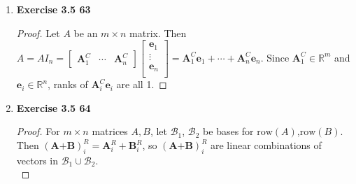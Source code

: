 \begin{enumerate}
\begin{proof}
		\noindent ($\Leftarrow$)
		Suppose that for $ \textbf{u}=\begin{bmatrix}
		u_1 \\
		\vdots \\
		u_m \\
		\end{bmatrix} \in \mathbb{R}^m $ and 
		$ \textbf{v}=\begin{bmatrix}
		v_1 \\
		\vdots \\
		v_m \\
		\end{bmatrix} \in \mathbb{R}^m $, $ \textbf{u}\textbf{v}^T = A$.
		\footnote{사실 문제가 틀림. Nonzero vectors $ \textbf{u} $, $ \textbf{v} $ 여야 함.} \\
		$ A=\textbf{u}\textbf{v}^T = \textbf{u}\begin{bmatrix}
		v_1 & \cdots & v_n \\
		\end{bmatrix} = \begin{bmatrix}
		v_{1}\textbf{u} & \cdots & v_{n}\textbf{u} \\
		\end{bmatrix} $ \\
		Then $ \{\textbf{u}\} $ forms a basis for $ \text{col}(A) $, since the columns of $ A $ are linear combination of $ \textbf{u} $. \\
		$ \therefore \text{dim}\left(\text{col}(A)\right) = \text{rank}(A) = 1$
	\end{proof}
	\item \textbf{Exercise 3.5 63}
	\begin{proof}
		Let $ A $ be an $ m\times n $ matrix. Then $ A=AI_{n} = \begin{bmatrix}
		\textbf{A}^C_1 & \cdots & \textbf{A}^C_n
		\end{bmatrix} \begin{bmatrix}
		\textbf{e}_1 \\
		\vdots \\
		\textbf{e}_n \\
		\end{bmatrix} = \textbf{A}^C_1\textbf{e}_1 + \cdots + \textbf{A}^C_n\textbf{e}_n $. Since $ \textbf{A}^C_1 \in \mathbb{R}^m $ and $ \textbf{e}_i\in \mathbb{R}^n $, ranks of $ \textbf{A}^C_i\textbf{e}_i $ are all 1.
	\end{proof}
	\item \textbf{Exercise 3.5 64}
	\begin{proof}
		For $ m\times n $ matrices $ A,B $, let $ \mathcal{B}_1 $, $ \mathcal{B}_2 $ be bases for $ \text{row}(A) $,$ \text{row}(B) $. Then $ \left(\textbf{A+B}\right)^R_i = \textbf{A}^R_i + \textbf{B}^R_i $, so $ \left(\textbf{A+B}\right)^R_i $ are linear combinations of vectors in $ \mathcal{B}_1 \cup  \mathcal{B}_2$. \\

\end{proof}
\end{enumerate}

